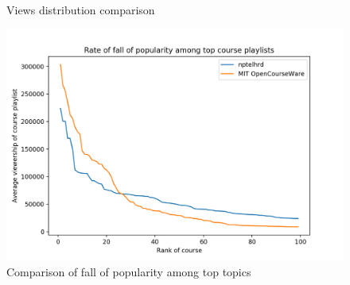\documentclass{article}
\begin{document}
\begin{figure}[!htpb]
    \centering
    \hspace*{-2.5em} \hspace*{-4em}
    \qquad
    \\
    \label{fig:example}%
    \caption{Views distribution comparison}
\end{figure}
\FloatBarrier

\begin{figure}[!htpb]
    \centering
    \includegraphics[scale=0.5]{images/fall_of_views.png}
    \caption{Comparison of fall of popularity among top topics}
    \label{fig:my_label}
\end{figure}
\FloatBarrier
\end{document}
